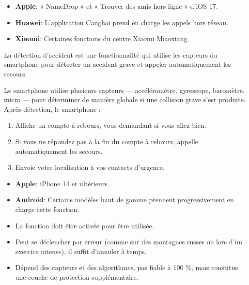 
\begin{itemize}
  \item \textbf{Apple}: « NameDrop » et « Trouver des amis hors ligne » d'iOS 17.
  \item \textbf{Huawei}: L'application Canghai prend en charge les appels hors réseau.
  \item \textbf{Xiaomi}: Certaines fonctions du centre Xiaomi Miaoxiang.
\end{itemize}


La détection d'accident est une fonctionnalité qui utilise les capteurs du smartphone pour détecter un accident grave et appeler automatiquement les secours.


Le smartphone utilise plusieurs capteurs — accéléromètre, gyroscope, baromètre, micro — pour déterminer de manière globale si une collision grave s'est produite. Après détection, le smartphone :

\begin{enumerate}
  \item Affiche un compte à rebours, vous demandant si vous allez bien.
  \item Si vous ne répondez pas à la fin du compte à rebours, appelle automatiquement les secours.
  \item Envoie votre localisation à vos contacts d'urgence.
\end{enumerate}


\begin{itemize}
  \item \textbf{Apple}: iPhone 14 et ultérieurs.
  \item \textbf{Android}: Certains modèles haut de gamme prennent progressivement en charge cette fonction.
\end{itemize}


\begin{itemize}
  \item La fonction doit être activée pour être utilisée.
  \item Peut se déclencher par erreur (comme sur des montagnes russes ou lors d'un exercice intense), il suffit d'annuler à temps.
  \item Dépend des capteurs et des algorithmes, pas fiable à 100 \%, mais constitue une couche de protection supplémentaire.
\end{itemize}

